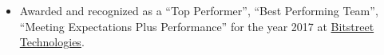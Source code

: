 \documentclass[10pt,a4paper]{article}
\newcommand{\quotes}[1]{``#1''}
\begin{document}
%  

\spacedhrule{1.6em}{-0.4em}

{%
    \begin{itemize}
    \item Awarded and recognized as a \quotes{Top Performer}, \quotes{Best Performing Team}, \quotes{Meeting Expectations Plus Performance} for the year 2017 at {\href{http://bitstreet.in/}{Bitstreet Technologies}}.
    \end{itemize}
}
\end{document}
